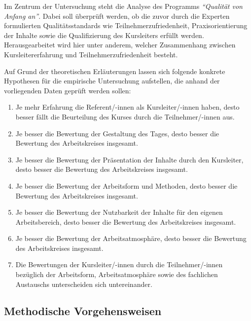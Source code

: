 \documentclass[12pt,a4paper]{article}
\begin{document}
Im Zentrum der Untersuchung steht die Analyse des Programms\textit{ "`Qualität von Anfang an"'}. Dabei soll überprüft werden, ob die zuvor durch die Experten formulierten Qualitätsstandards wie Teilnehmerzufriedenheit, Praxisorientierung der Inhalte sowie die Qualifizierung des Kursleiters erfüllt werden. Herausgearbeitet wird hier unter anderem, welcher Zusammenhang zwischen Kursleitererfahrung und Teilnehmerzufriedenheit besteht.

Auf Grund der theoretischen Erläuterungen lassen sich folgende konkrete Hypothesen für die empirische Untersuchung aufstellen, die anhand der vorliegenden Daten geprüft werden sollen:


\begin{enumerate}
\itshape
\item Je mehr Erfahrung die Referent/-innen als Kursleiter/-innen haben, desto besser fällt die Beurteilung des Kurses durch die Teilnehmer/-innen aus.

\item Je besser die Bewertung der Gestaltung des Tages, desto besser die Bewertung des Arbeitskreises insgesamt.

\item Je besser die Bewertung der Präsentation der Inhalte durch den Kursleiter, desto besser die Bewertung des Arbeitskreises insgesamt.

\item Je besser die Bewertung der Arbeitsform und Methoden, desto besser die Bewertung des Arbeitskreises insgesamt.

\item Je besser die Bewertung der Nutzbarkeit der Inhalte für den eigenen Arbeitsbereich, desto besser die Bewertung des Arbeitskreises insgesamt.

\item Je besser die Bewertung der Arbeitsatmosphäre, desto besser die Bewertung des Arbeitskreises insgesamt.

\item Die Bewertungen der Kursleiter/-innen durch die Teilnehmer/-innen bezüglich der Arbeitsform, Arbeitsatmosphäre sowie des fachlichen Austauschs unterscheiden sich untereinander.
\end{enumerate}

\normalfont

\subsection{Methodische Vorgehensweisen}
\end{document}
